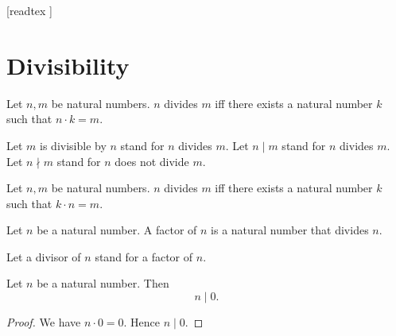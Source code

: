 \documentclass[10pt]{article}
\begin{document}
  \begin{imports}
    \begin{forthel}

      [readtex ]

    \end{forthel}
  \end{imports}


  \section{Divisibility}

  \begin{forthel}
    \begin{definition}
      Let $n, m$ be natural numbers.
      $n$ divides $m$ iff there exists a natural number $k$ such that
      $n \cdot k = m$.
    \end{definition}

    Let $m$ is divisible by $n$ stand for $n$ divides $m$.
    Let $n \mid m$ stand for $n$ divides $m$.
    Let $n \nmid m$ stand for $n$ does not divide $m$.
  \end{forthel}

  \begin{forthel}
    \begin{lemma}
      Let $n, m$ be natural numbers.
      $n$ divides $m$ iff there exists a natural number $k$ such that
      $k \cdot n = m$.
    \end{lemma}
  \end{forthel}

  \begin{forthel}
    \begin{definition}
      Let $n$ be a natural number.
      A factor of $n$ is a natural number that divides $n$.
    \end{definition}

    Let a divisor of $n$ stand for a factor of $n$.
  \end{forthel}

  \begin{forthel}
    \begin{proposition}
      Let $n$ be a natural number.
      Then \[ n \mid 0. \]
    \end{proposition}
    \begin{proof}
      We have $n \cdot 0 = 0$.
      Hence $n \mid 0$.
    \end{proof}
  \end{forthel}
\end{document}
